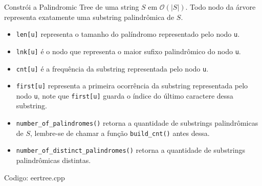 \documentclass[10pt, a4paper, oneside]{book}
\begin{document}
Constrói a Palindromic Tree de uma string $S$ em $\mathcal{O}(|S|)$. Todo nodo da árvore representa exatamente uma substring palindrômica de $S$.



\begin{itemize}
\item \texttt{len[u]} representa o tamanho do palíndromo representado pelo nodo \texttt{u}.
\item \texttt{lnk[u]} é o nodo que representa o maior sufixo palindrômico do nodo \texttt{u}.
\item \texttt{cnt[u]} é a frequência da substring representada pelo nodo \texttt{u}.
\item \texttt{first[u]} representa a primeira ocorrência da substring representada pelo nodo \texttt{u}, note que \texttt{first[u]} guarda o índice do último caractere dessa substring.
\item \texttt{number\_of\_palindromes()} retorna a quantidade de substrings palindrômicas de $S$, lembre-se de chamar a função \texttt{build\_cnt()} antes dessa.
\item \texttt{number\_of\_distinct\_palindromes()} retorna a quantidade de substrings palindrômicas distintas.
\end{itemize}

\hfill

Codigo: eertree.cpp
\end{document}
